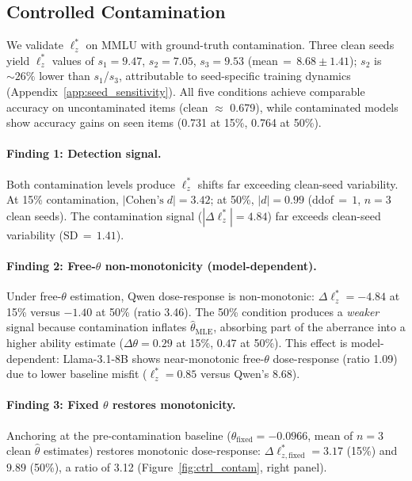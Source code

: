 \subsection{Controlled Contamination}
\label{sec:ctrl_contam}

We validate $\ell_z^*$ on MMLU with ground-truth contamination.
Three clean seeds yield $\ell_z^*$ values of $s_1{=}9.47$, $s_2{=}7.05$, $s_3{=}9.53$ (mean$\,{=}\,8.68\pm1.41$); $s_2$ is ${\sim}26\%$ lower than $s_1$/$s_3$, attributable to seed-specific training dynamics (Appendix~\ref{app:seed_sensitivity}).
All five conditions achieve comparable accuracy on uncontaminated items (clean $\approx$ 0.679), while contaminated models show accuracy gains on seen items (0.731 at 15\%, 0.764 at 50\%).

\paragraph{Finding 1: Detection signal.}
Both contamination levels produce $\ell_z^*$ shifts far exceeding clean-seed variability.
At 15\% contamination, $|\text{Cohen's}\;d|{=}3.42$; at 50\%, $|d|{=}0.99$ (ddof$\,{=}\,1$, $n{=}3$ clean seeds).
The contamination signal ($|\Delta\ell_z^*|{=}4.84$) far exceeds clean-seed variability (SD$\,{=}\,1.41$).

\paragraph{Finding 2: Free-$\theta$ non-monotonicity (model-dependent).}
Under free-$\theta$ estimation, Qwen dose-response is non-monotonic: $\Delta\ell_z^*{=}{-}4.84$ at 15\% versus ${-}1.40$ at 50\% (ratio 3.46).
The 50\% condition produces a \emph{weaker} signal because contamination inflates $\hat{\theta}_{\text{MLE}}$, absorbing part of the aberrance into a higher ability estimate ($\Delta\theta{=}0.29$ at 15\%, $0.47$ at 50\%).
This effect is model-dependent: Llama-3.1-8B shows near-monotonic free-$\theta$ dose-response (ratio 1.09) due to lower baseline misfit ($\ell_z^*{=}0.85$ versus Qwen's 8.68).

\paragraph{Finding 3: Fixed $\theta$ restores monotonicity.}
Anchoring at the pre-contamination baseline ($\theta_{\text{fixed}}{=}{-}0.0966$, mean of $n{=}3$ clean $\hat{\theta}$ estimates) restores monotonic dose-response: $\Delta\ell_{z,\text{fixed}}^*{=}3.17$ (15\%) and $9.89$ (50\%), a ratio of 3.12 (Figure~\ref{fig:ctrl_contam}, right panel).

